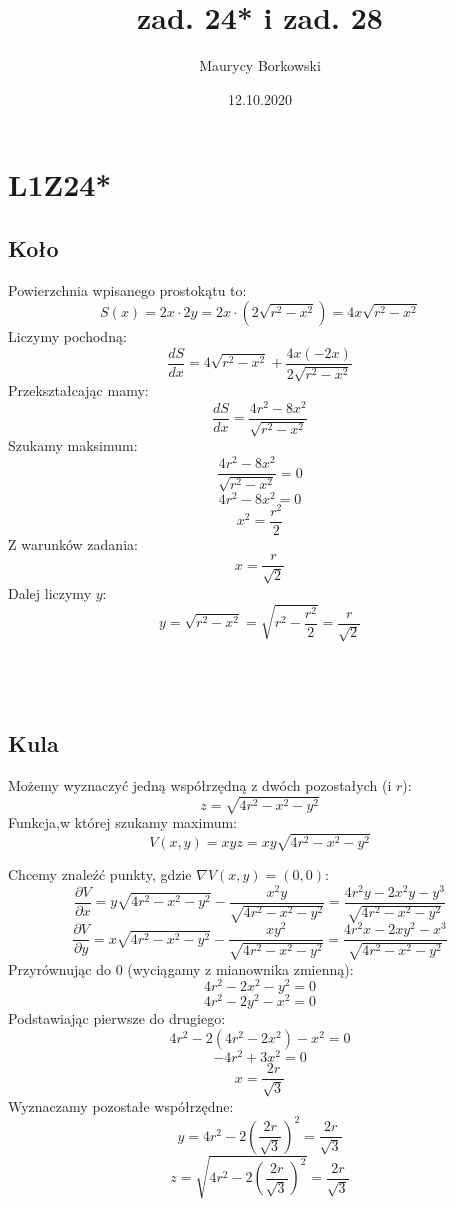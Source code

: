 \documentclass{article}
\title{zad. 24* i zad. 28}
\date{12.10.2020}
\author{Maurycy Borkowski}
\begin{document}
\maketitle

\section{L1Z24*}
\subsection*{Koło}
Powierzchnia wpisanego prostokątu to:
$$S(x) = 2x \cdot 2y = 2x \cdot (2\sqrt{r^2-x^2}) = 4x\sqrt{r^2-x^2}$$
Liczymy pochodną:
$$\frac{dS}{dx} = 4\sqrt{r^2-x^2} + \frac{4x(-2x)}{2\sqrt{r^2-x^2}}$$
Przekształcając mamy:
$$\frac{dS}{dx} = \frac{4r^2-8x^2}{\sqrt{r^2-x^2}}$$
Szukamy maksimum:
$$
\frac{4r^2-8x^2}{\sqrt{r^2-x^2}} = 0
$$
$$
4r^2-8x^2 = 0
$$
$$
x^2 = \frac{r^2}{2}
$$
Z warunków zadania:
$$
x = \frac{r}{\sqrt{2}}
$$
Dalej liczymy $y$:
$$
y = \sqrt{r^2 - x^2} = \sqrt{r^2 - \frac{r^2}{2}} = \frac{r}{\sqrt{2}}
$$\\\\\\
\subsection*{Kula}
Możemy wyznaczyć jedną współrzędną z dwóch pozostałych (i $r$):
$$
z = \sqrt{4r^2 - x^2 - y^2}
$$
Funkcja,w której szukamy maximum:
$$
V(x,y) = xyz = xy\sqrt{4r^2 - x^2 - y^2}
$$

Chcemy znaleźć punkty, gdzie $\nabla V(x,y) = (0,0)$:
$$
\frac{\partial V}{\partial x} = y\sqrt{4r^2 - x^2 - y^2} - \frac{x^2y}{\sqrt{4r^2 - x^2 - y^2}} = \frac{4r^2y - 2x^2y - y^3}{\sqrt{4r^2 - x^2 - y^2}}
$$
$$
\frac{\partial V}{\partial y} = x\sqrt{4r^2 - x^2 - y^2} - \frac{xy^2}{\sqrt{4r^2 - x^2 - y^2}} = \frac{4r^2x - 2xy^2 - x^3}{\sqrt{4r^2 - x^2 - y^2}}
$$
Przyrównując do $0$ (wyciągamy z mianownika zmienną):
$$
4r^2 - 2x^2 - y^2 = 0
$$
$$
4r^2 - 2y^2 - x^2 = 0
$$
Podstawiając pierwsze do drugiego:
$$
4r^2 - 2(4r^2 -2x^2) - x^2 = 0
$$
$$
- 4r^2 + 3x^2 = 0
$$
$$
x = \frac{2r}{\sqrt{3}}
$$
Wyznaczamy pozostałe współrzędne:
$$
y = 4r^2 - 2(\frac{2r}{\sqrt{3}})^2 =\frac{2r}{\sqrt{3}}
$$
$$
z = \sqrt{4r^2 - 2(\frac{2r}{\sqrt{3}})^2} = \frac{2r}{\sqrt{3}}
$$\\\\\\\\\\\\\\\\\\\\\\
\end{document}
